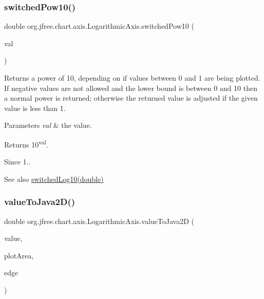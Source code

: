 \subsubsection{\texorpdfstring{switched\+Pow10()}{switchedPow10()}}
{\footnotesize\ttfamily double org.\+jfree.\+chart.\+axis.\+Logarithmic\+Axis.\+switched\+Pow10 (\begin{DoxyParamCaption}\item[{double}]{val }\end{DoxyParamCaption})}

Returns a power of 10, depending on if values between 0 and 1 are being plotted. If negative values are not allowed and the lower bound is between 0 and 10 then a normal power is returned; otherwise the returned value is adjusted if the given value is less than 1.


\begin{DoxyParams}{Parameters}
{\em val} & the value.\\
\hline
\end{DoxyParams}
\begin{DoxyReturn}{Returns}
10\textsuperscript{val}.
\end{DoxyReturn}
\begin{DoxySince}{Since}
1.. 
\end{DoxySince}
\begin{DoxySeeAlso}{See also}
\mbox{\hyperlink{classorg_1_1jfree_1_1chart_1_1axis_1_1_logarithmic_axis_adde2b61e7573af7c9cdf86b65a64c50d}{switched\+Log10(double)}} 
\end{DoxySeeAlso}
\mbox{\label{classorg_1_1jfree_1_1chart_1_1axis_1_1_logarithmic_axis_ae3af543ac00ea122f9396978d8638afb}} 
\subsubsection{\texorpdfstring{value\+To\+Java2\+D()}{valueToJava2D()}}
{\footnotesize\ttfamily double org.\+jfree.\+chart.\+axis.\+Logarithmic\+Axis.\+value\+To\+Java2D (\begin{DoxyParamCaption}\item[{double}]{value,  }\item[{Rectangle2D}]{plot\+Area,  }\item[{Rectangle\+Edge}]{edge }\end{DoxyParamCaption})}

